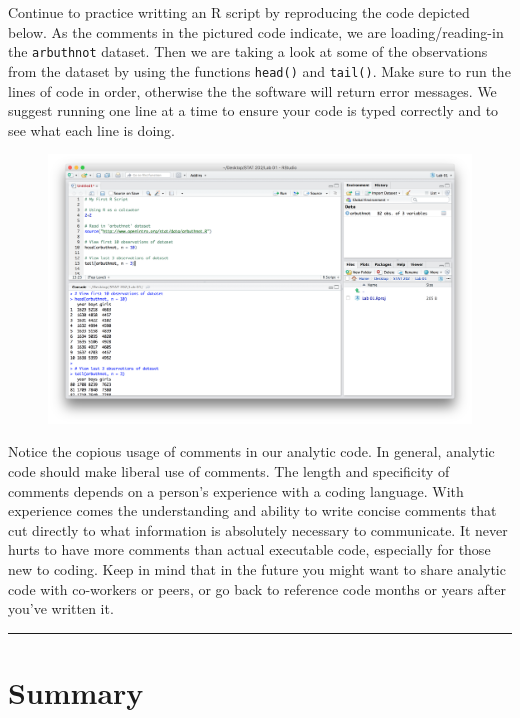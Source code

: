 \documentclass[]{book}
\theoremstyle{definition}
\theoremstyle{definition}
\theoremstyle{definition}
\theoremstyle{remark}
\begin{document}
Continue to practice writting an R script by reproducing the code
depicted below. As the comments in the pictured code indicate, we are
loading/reading-in the \texttt{arbuthnot} dataset. Then we are taking a
look at some of the observations from the dataset by using the functions
\texttt{head()} and \texttt{tail()}. Make sure to run the lines of code
in order, otherwise the the software will return error messages. We
suggest running one line at a time to ensure your code is typed
correctly and to see what each line is doing.

\begin{figure}
\centering
\includegraphics{./assets/images/01-08.png}
\caption{}
\end{figure}

Notice the copious usage of comments in our analytic code. In general,
analytic code should make liberal use of comments. The length and
specificity of comments depends on a person's experience with a coding
language. With experience comes the understanding and ability to write
concise comments that cut directly to what information is absolutely
necessary to communicate. It never hurts to have more comments than
actual executable code, especially for those new to coding. Keep in mind
that in the future you might want to share analytic code with co-workers
or peers, or go back to reference code months or years after you've
written it.

\begin{center}\rule{0.5\linewidth}{\linethickness}\end{center}

\section{Summary}\label{summary}
\end{document}
